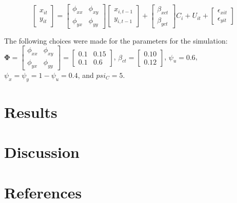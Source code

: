 \documentclass[
]{interact}
\newlength{\cslhangindent}
\newlength{\cslentryspacingunit} %
\newenvironment{CSLReferences}[2] %
 {%
  \setlength{\parindent}{0pt}
  \ifodd #1
  \let\oldpar\par
  \def\par{\hangindent=\cslhangindent\oldpar}
  \fi
  \setlength{\parskip}{#2\cslentryspacingunit}
 }%
 {}
\begin{document}
\[
\begin{bmatrix}
x_{it}\\
y_{it}
\end{bmatrix}
=
\begin{bmatrix}
\phi_{xx} & \phi_{xy}\\
\phi_{yx} & \phi_{yy}
\end{bmatrix}
\begin{bmatrix}
x_{i,t-1}\\
y_{i,t-1}
\end{bmatrix}
+
\begin{bmatrix}
\beta_{xct}\\
\beta_{yct}
\end{bmatrix}
C_{i} +
U_{it} +
\begin{bmatrix}
\epsilon_{xit}\\
\epsilon_{yit}
\end{bmatrix}
\]

The following choices were made for the parameters for the simulation:
\(\boldsymbol{\Phi} = \begin{bmatrix} \phi_{xx} & \phi_{xy}\\ \phi_{yx} & \phi_{yy} \end{bmatrix} = \begin{bmatrix} 0.1 & 0.15\\ 0.1 & 0.6 \end{bmatrix}\),
\(\beta_{ct} = \begin{bmatrix} 0.10\\0.12 \end{bmatrix}\),
\(\psi_u = 0.6\), \(\psi_x = \psi_y = 1 - \psi_u = 0.4\), and
\(psi_C = 5\).

\hypertarget{results}{%
\section{Results}\label{results}}

\hypertarget{discussion}{%
\section{Discussion}\label{discussion}}

\newpage{}

\hypertarget{references}{%
\section*{References}\label{references}}

\hypertarget{refs}{}
\begin{CSLReferences}{0}{0}
\end{CSLReferences}
\end{document}
